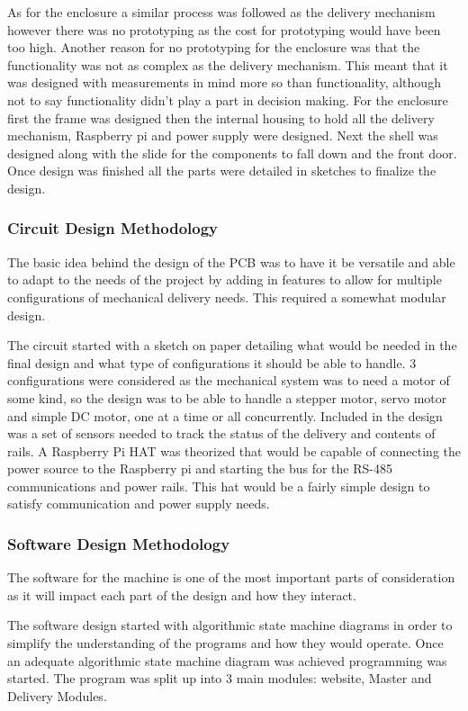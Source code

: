 \documentclass[a4paper,11pt]{article}
\numberwithin{figure}{section}
\begin{document}
As for the enclosure a similar process was followed as the delivery mechanism however there was no prototyping as the cost for prototyping would have been too high. Another reason for no prototyping for the enclosure was that the functionality was not as complex as the delivery mechanism. This meant that it was designed with measurements in mind more so than functionality, although not to say functionality didn't play a part in decision making. For the enclosure first the frame was designed then the internal housing to hold all the delivery mechanism, Raspberry pi and power supply were designed. Next the shell was designed along with the slide for the components to fall down and the front door. Once design was finished all the parts were detailed in sketches to finalize the design.

\subsubsection{Circuit Design Methodology}
The basic idea behind the design of the PCB was to have it be versatile and able to adapt to the needs of the project by adding in features to allow for multiple configurations of mechanical delivery needs. This required a somewhat modular design.



The circuit started with a sketch on paper detailing what would be needed in the final design and what type of configurations it should be able to handle. 3 configurations were considered as the mechanical system was to need a motor of some kind, so the design was to be able to handle a stepper motor, servo motor and simple DC motor, one at a time or all concurrently. Included in the design was a set of sensors needed to track the status of the delivery and contents of rails.
A Raspberry Pi HAT was theorized that would be capable of connecting the power source to the Raspberry pi and starting the bus for the RS-485 communications and power rails. This hat would be a fairly simple design to satisfy communication and power supply needs.



\subsubsection{Software Design Methodology}
The software for the machine is one of the most important parts of consideration as it will impact each part of the design and how they interact.

The software design started with algorithmic state machine diagrams in order to simplify the understanding of the programs and how they would operate. Once an adequate algorithmic state machine diagram was achieved programming was started. The program was split up into 3 main modules: website, Master and Delivery Modules. 
\end{document}
